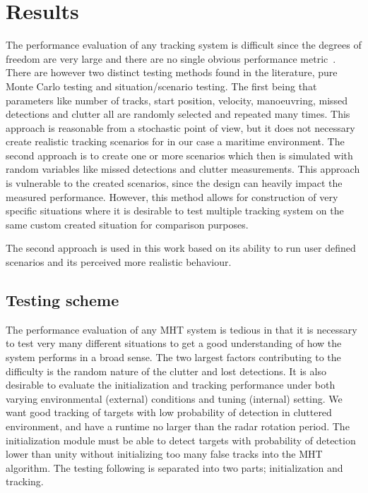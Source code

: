 \chapter{Results}\label{chapter:results}
The performance evaluation of any tracking system is difficult since the degrees of freedom are very large and there are no single obvious performance metric~\cite{Schuhmacher2008}. There are however two distinct testing methods found in the literature, pure Monte Carlo testing and situation/scenario testing. The first being that parameters like number of tracks, start position, velocity, manoeuvring, missed detections and clutter all are randomly selected and repeated many times. This approach is reasonable from a stochastic point of view, but it does not necessary create realistic tracking scenarios for in our case a maritime environment. The second approach is to create one or more scenarios which then is simulated with random variables like missed detections and clutter measurements. This approach is vulnerable to the created scenarios, since the design can heavily impact the measured performance. However, this method allows for construction of very specific situations where it is desirable to test multiple tracking system on the same custom created situation for comparison purposes.

The second approach is used in this work based on its ability to run user defined scenarios and its perceived more realistic behaviour. 

\section{Testing scheme}
The performance evaluation of any MHT system is tedious in that it is necessary to test very many different situations to get a good understanding of how the system performs in a broad sense. The two largest factors contributing to the difficulty is the random nature of the clutter and lost detections. It is also desirable to evaluate the initialization and tracking performance under both varying environmental (external) conditions and tuning (internal) setting. We want good tracking of targets with low probability of detection in cluttered environment, and have a runtime no larger than the radar rotation period. The initialization module must be able to detect targets with probability of detection lower than unity without initializing too many false tracks into the MHT algorithm. The testing following is separated into two parts; initialization and tracking.

